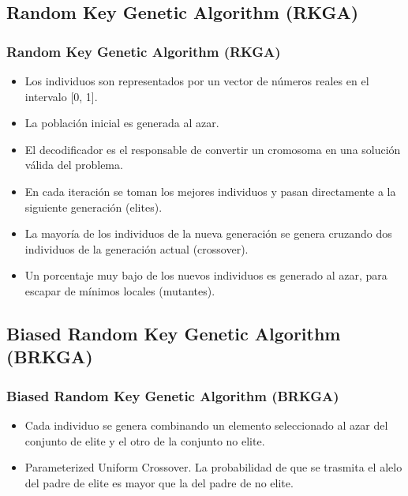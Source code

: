 \documentclass{beamer}
\begin{document}
\subsection{Random Key Genetic Algorithm (RKGA)}

\begin{frame}
\frametitle{Random Key Genetic Algorithm (RKGA)}

\begin{itemize}
    \item Los individuos son representados por un vector de números reales en el intervalo [0, 1].
    \pause
    \item La población inicial es generada al azar.
    \pause
    \item El decodificador es el responsable de convertir un cromosoma en una solución válida del problema.
    \pause
    \item En cada iteración se toman los mejores individuos y pasan directamente a la siguiente generación (elites).
    \pause
    \item La mayoría de los individuos de la nueva generación se genera cruzando dos individuos de la generación actual (crossover).
    \pause
    \item Un porcentaje muy bajo de los nuevos individuos es generado al azar, para escapar de mínimos locales (mutantes).
\end{itemize}

\end{frame}


\subsection{Biased Random Key Genetic Algorithm (BRKGA)}

\begin{frame}
\frametitle{Biased Random Key Genetic Algorithm (BRKGA)}

\begin{itemize}
    \item Cada individuo se genera combinando un elemento seleccionado al azar del conjunto de elite y el otro de la conjunto no elite.
    \pause
    \item Parameterized Uniform Crossover. La probabilidad de que se trasmita el alelo del padre de elite es mayor que la del padre de no elite.
\end{itemize}

\end{frame}
\end{document}
